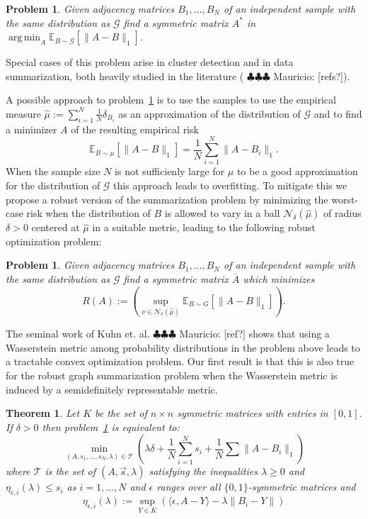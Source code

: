 \documentclass[12pt]{amsart}
\newtheorem{theorem}[lemma]{Theorem}
\newtheorem{problem}[lemma]{Problem}
\theoremstyle{remark}
\DeclareMathOperator*{\argmin}{arg\,min}
\newcommand{\EE}{\mathbb{E}}
\newcommand{\grG}{{\mathcal{G}}}
\newcommand{\mv}[1]{{\color{red} \sf $\clubsuit\clubsuit\clubsuit$ Mauricio: [#1]}}
\begin{document}
\begin{problem}\label{Prob} Given adjacency matrices $B_1,\dots, B_N$ of an independent sample with the same distribution as $\grG$ find a symmetric matrix $A^*$ in $\argmin_A \EE_{B\sim \grG}[\|A-B\|_1]$. 
\end{problem}

Special cases of this problem arise in cluster detection and in data summarization, both heavily studied in the literature (\mv{refs?}).

A possible approach to problem~\ref{Prob} is to use the samples to use the empirical measure $\hat{\mu}:=\sum_{i=1}^N \frac{1}{N}\delta_{B_i}$ as an approximation of the distribution of $\grG$ and to find a minimizer $A$ of the resulting empirical risk
\[ \EE_{B\sim \mu}[\|A-B\|_1]=\frac{1}{N}\sum_{i=1}^N \|A-B_i\|_1.\]
When the sample size $N$ is not sufficienly large for $\hat{\mu}$ to be a good approximation for the distribution of $\grG$ this approach leads to overfitting. To mitigate this we propose a robust version of the summarization problem by minimizing the worst-case risk when the distribution of $B$ is allowed to vary in a ball $\mathcal{N}_{\delta}(\hat{\mu})$ of radius $\delta>0$ centered at $\hat{\mu}$ in a suitable metric, leading to the following robust optimization problem:

\begin{problem}\label{ProbRobusto} Given adjacency matrices $B_1,\dots, B_N$ of an independent sample with the same distribution as $\grG$ find a symmetric matrix $\overline{A}$ which minimizes  
\[R(A):=\left(\sup_{\nu\in \mathcal{N}_{\delta}(\hat{\mu})} \EE_{B\sim G}[\|A-B\|_1]\right).\] 
\end{problem}


The seminal work of Kuhn et. al. \mv{ref?} shows that using a Wasserstein metric among probability distributions in the problem above leads to a tractable convex optimization problem. Our first result is that this is also true for the robust graph summarization problem when the Wasserstein metric is induced by a semidefinitely representable metric.

\begin{theorem}\label{thm: finiteConvex} Let $K$ be the set of $n\times n$ symmetric matrices with entries in $[0,1]$. If $\delta>0$ then problem~\ref{ProbRobusto} is equivalent to:
\[\min_{(A,s_1,\dots, s_N,\lambda)\in \mathcal{T}}\left( \lambda\delta +\frac{1}{N}\sum_{i=1}^N s_i + \frac{1}{N}\sum \|A-B_i\|_1\right)\]
where $\mathcal{T}$ is the set of $(A,\vec{s},\lambda)$  satisfying the inequalities $\lambda\geq 0$ and $\eta_{\epsilon, i}(\lambda)\leq s_i$ as $i=1,\dots, N$ and $\epsilon$ ranges over all $\{0,1\}$-symmetric matrices and
\[\eta_{\epsilon, i}(\lambda):= \sup_{Y\in K} \left(\langle \epsilon, A-Y\rangle -\lambda \|B_i-Y\|\right)\]
\end{theorem}
\end{document}
